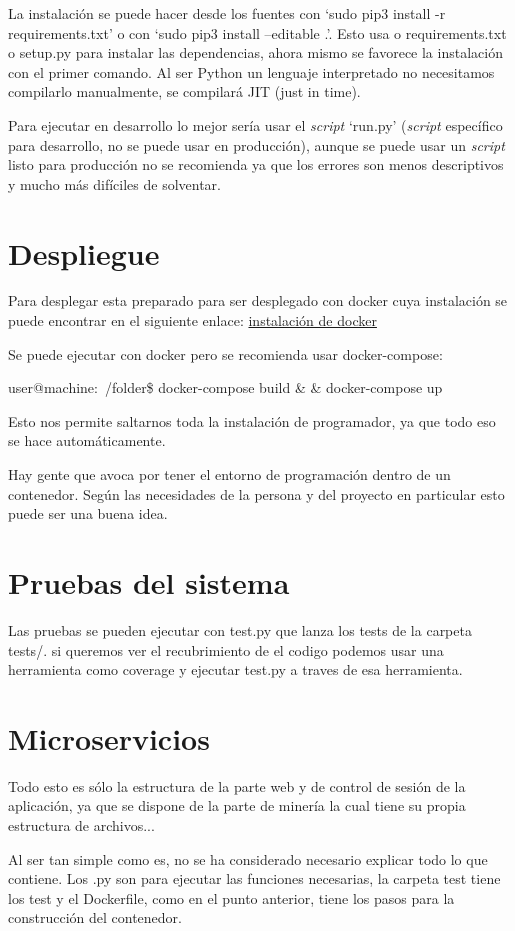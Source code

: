 La instalación se puede hacer desde los fuentes con `sudo pip3 install -r requirements.txt' o con `sudo pip3 install --editable .'. Esto usa o requirements.txt o setup.py para instalar las dependencias, ahora mismo se favorece la instalación con el primer comando. Al ser Python un lenguaje interpretado no necesitamos compilarlo manualmente, se compilará JIT (just in time).

Para ejecutar en desarrollo lo mejor sería usar el \emph{script} `run.py' (\emph{script} específico para desarrollo, no se puede usar en producción), aunque se puede usar un \emph{script} listo para producción no se recomienda ya que los errores son menos descriptivos y mucho más difíciles de solventar.

\section{Despliegue}

Para desplegar esta preparado para ser desplegado con docker cuya instalación se puede encontrar en el siguiente enlace:  \href{https://docs.docker.com/engine/installation}{instalación de docker} 
	

Se puede ejecutar con docker pero se recomienda usar docker-compose:

user@machine:~/folder\$ docker-compose build \& \& docker-compose up 

Esto nos permite saltarnos toda la instalación de programador, ya que todo eso se hace automáticamente.

Hay gente que avoca por tener el entorno de programación dentro de un contenedor. Según las necesidades de la persona y del proyecto en particular esto puede ser una buena idea. 


\section{Pruebas del sistema}

Las pruebas se pueden ejecutar con test.py que lanza los tests de la carpeta tests/. si queremos ver el recubrimiento de el codigo podemos usar una herramienta como coverage y ejecutar test.py a traves de esa herramienta.  


\section{Microservicios}

Todo esto es sólo la estructura de la parte web y de control de sesión de la aplicación, ya que se dispone de la parte de minería la cual tiene su propia estructura de archivos...

Al ser tan simple como es, no se ha considerado necesario explicar todo lo que contiene. Los .py son  para ejecutar las funciones necesarias, la carpeta test tiene los test y el Dockerfile, como en el punto anterior, tiene los pasos para la construcción del contenedor.
